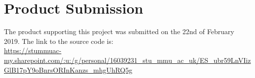 \chapter{Product Submission}\label{app:product}
The product supporting this project was submitted on the 22nd of February 2019. The link to the source code is:\\
\url{https://stummuac-my.sharepoint.com/:u:/g/personal/16039231_stu_mmu_ac_uk/ES_ubr59LnVIizGlB17pY9oBnrsORInKanzs_mhgUhRQ5g}